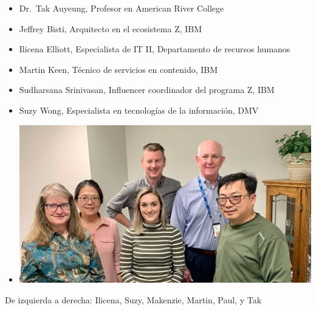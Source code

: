 \begin{itemize}
\item
  Dr.~Tak Auyeung, Profesor en American River College
\item
  Jeffrey Bisti, Arquitecto en el ecosistema Z, IBM
\item
  Ilicena Elliott, Especialista de IT II, Departamento de recursos humanos
\item
  Martin Keen, Técnico de servicios en contenido, IBM
\item
  Sudharsana Srinivasan, Influencer coordinador del programa Z, IBM
\item
  Suzy Wong, Especialista en tecnologías de la información, DMV
\item
  \includegraphics{Images/image004.jpg}
\end{itemize}

De izquierda a derecha: Ilicena, Suzy, Makenzie, Martin, Paul, y Tak
\pagebreak
